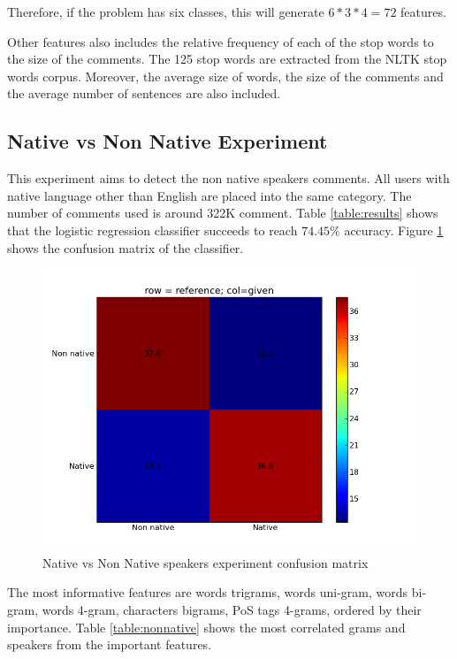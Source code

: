 \documentclass[11pt]{article}
\begin{document}
Therefore, if the problem has six classes, this will generate $6*3*4 = 72$ features.

Other features also includes the relative frequency of each of the stop words to the size of the comments. The 125 stop words are extracted from the NLTK stop words corpus. Moreover, the average size of words, the size of the comments and the average number of sentences are also included.


\subsection{Native vs Non Native Experiment}
This experiment aims to detect the non native speakers comments. All users with native language other than English are placed into the same category. The number of comments used is around 322K comment. Table \ref{table:results} shows that the logistic regression classifier succeeds to reach $74.45\%$ accuracy. Figure \ref{non_cfm} shows the confusion matrix of the classifier.


\begin{figure}[htp]
\centering
\includegraphics[scale=0.45]{native_cfm.png}
\caption{Native vs Non Native speakers experiment confusion matrix}
\label{non_cfm}
\end{figure}


The most informative features are words trigrams, words uni-gram, words bi-gram, words 4-gram, characters bigrams, PoS tags 4-grams, ordered by their importance. Table \ref{table:nonnative} shows the most correlated grams and speakers from the important features.
\end{document}
